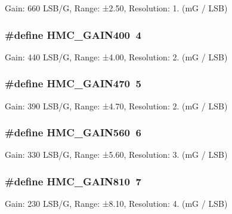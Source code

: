 Gain\+: 660 L\+S\+B/\+G, Range\+: ±2.50, Resolution\+: 1. (m\+G / L\+S\+B) \hypertarget{group___gain_settings_ga406a5e7c4a8498b42b8ca64bd0435574}{
\subsubsection[{H\+M\+C\+\_\+\+G\+A\+I\+N400}]{\setlength{\rightskip}{0pt plus 5cm}\#define H\+M\+C\+\_\+\+G\+A\+I\+N400~4}}\label{group___gain_settings_ga406a5e7c4a8498b42b8ca64bd0435574}
Gain\+: 440 L\+S\+B/\+G, Range\+: ±4.00, Resolution\+: 2. (m\+G / L\+S\+B) \hypertarget{group___gain_settings_ga896766dd9b91658ce28119a244de3088}{
\subsubsection[{H\+M\+C\+\_\+\+G\+A\+I\+N470}]{\setlength{\rightskip}{0pt plus 5cm}\#define H\+M\+C\+\_\+\+G\+A\+I\+N470~5}}\label{group___gain_settings_ga896766dd9b91658ce28119a244de3088}
Gain\+: 390 L\+S\+B/\+G, Range\+: ±4.70, Resolution\+: 2. (m\+G / L\+S\+B) \hypertarget{group___gain_settings_ga01cd2748f346ff38dd0ed663662b8ed4}{
\subsubsection[{H\+M\+C\+\_\+\+G\+A\+I\+N560}]{\setlength{\rightskip}{0pt plus 5cm}\#define H\+M\+C\+\_\+\+G\+A\+I\+N560~6}}\label{group___gain_settings_ga01cd2748f346ff38dd0ed663662b8ed4}
Gain\+: 330 L\+S\+B/\+G, Range\+: ±5.60, Resolution\+: 3. (m\+G / L\+S\+B) \hypertarget{group___gain_settings_ga8c832d026fc407263418262ecfe65650}{
\subsubsection[{H\+M\+C\+\_\+\+G\+A\+I\+N810}]{\setlength{\rightskip}{0pt plus 5cm}\#define H\+M\+C\+\_\+\+G\+A\+I\+N810~7}}\label{group___gain_settings_ga8c832d026fc407263418262ecfe65650}
Gain\+: 230 L\+S\+B/\+G, Range\+: ±8.10, Resolution\+: 4. (m\+G / L\+S\+B) 